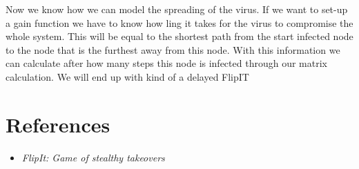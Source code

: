 \documentclass[a4paper, 11pt]{article}
\begin{document}
 Now we know how we can model the spreading of the virus. If we want to set-up a gain function we have to know how ling it takes for the virus to compromise the whole system. This will be equal to the shortest path from the start infected node to the node that is the furthest away from this node. With this information we can calculate after how many steps this node is infected through our matrix calculation. We will end up with kind of a delayed FlipIT
 
\section{References}
\begin{itemize}
\item \textit{FlipIt: Game of stealthy takeovers}
\end{itemize}
\end{document}
